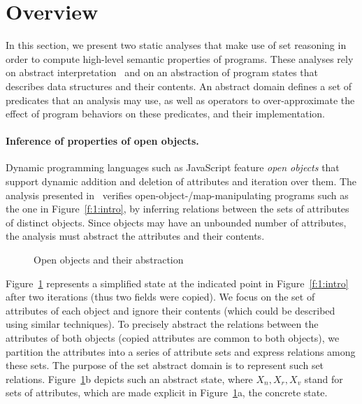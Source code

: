 \section{Overview}
\label{s:2:over}
In this section, we present two static analyses that make use of set
reasoning in order to compute high-level semantic properties of
programs.
These analyses rely on abstract interpretation~\cite{cc:popl:77} and
on an abstraction of program states that describes data structures
and their contents.
An abstract domain defines a set of predicates that an analysis may
use, as well as operators to over-approximate the effect of program
behaviors on these predicates, and their implementation.

\paragraph{Inference of properties of open objects.}
Dynamic programming languages such as JavaScript feature {\em open objects}
that support dynamic addition and deletion of attributes and iteration over
them.
The analysis presented in~\cite{hoo:14:sas} verifies
open-object-/map-manipulating programs such as the one
in Figure~\ref{f:1:intro}, by
inferring relations between the sets of attributes
of distinct objects.
Since objects may have an unbounded number of attributes, the analysis must 
abstract the attributes and their contents. %
\newcommand{\varsrc}{\cvar{src}}%
\newcommand{\vardst}{\cvar{dst}}%
\begin{figure}[t]
  \newcommand{\picscale}{0.82}
  \centering
    \tikzpics{\picscale}{hoo-inv}
  \caption{Open objects and their abstraction}
  \label{f:2:hoo}
\end{figure}%
Figure~\ref{f:2:hoo} represents a simplified state at the indicated
point in Figure~\ref{f:1:intro}
after two iterations (thus two fields were copied).
We focus on the set of attributes of each object and ignore their
contents (which could be described using similar techniques).
To precisely abstract the relations between the attributes of both objects
(\eg copied attributes are common to both objects), we partition the
attributes into a series of attribute sets
and express relations among these sets.
The purpose of the set abstract domain is to represent such set
relations.
Figure~\ref{f:2:hoo}b depicts such an abstract
state, where \( X_n, X_r, X_v \) stand for sets of attributes, which are
made explicit in Figure~\ref{f:2:hoo}a, the concrete state.

